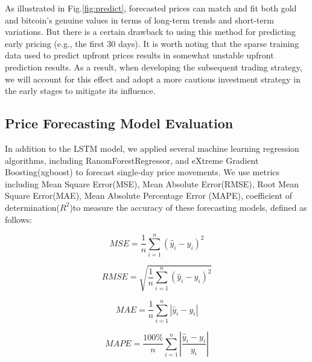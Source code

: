 \documentclass{mcmthesis}
\begin{document}
As illustrated in Fig.\ref{fig:predict}, forecasted prices can match and fit both gold and bitcoin's genuine values in terms of long-term trends and short-term variations. But there is a certain drawback to using this method for predicting early pricing (e.g., the first 30 days). It is worth noting that the sparse training data used to predict upfront prices results in somewhat unstable upfront prediction results. As a result, when developing the subsequent trading strategy, we will account for this effect and adopt a more cautious investment strategy in the early stages to mitigate its influence.

\subsection{Price Forecasting Model Evaluation}
In addition to the LSTM model, we applied several machine learning regression algorithms, including RanomForestRegressor, and eXtreme Gradient Boosting(xgboost) to forecast single-day price movements. We use metrics including Mean Square Error(MSE), Mean Absolute Error(RMSE), Root Mean Square Error(MAE), Mean Absolute Percentage Error (MAPE), coefficient of determination($R^{2}$)to measure the accuracy of these forecasting models, defined as follows:

\begin{equation}
MSE=\frac{1}{n} \sum_{i=1}^{n}\left(\hat{y}_{i}-y_{i}\right)^{2}
\end{equation}

\begin{equation}
RMSE=\sqrt{\frac{1}{n} \sum_{i=1}^{n}\left(\hat{y}_{i}-y_{i}\right)^{2}}
\end{equation}

\begin{equation}
MAE=\frac{1}{n} \sum_{i=1}^{n}\left|\hat{y}_{i}-y_{i}\right|
\end{equation}

\begin{equation}
	MAPE=\frac{100 \%}{n} \sum_{i=1}^{n}\left|\frac{\hat{y}_{i}-y_{i}}{y_{i}}\right|
\end{equation}
\end{document}
